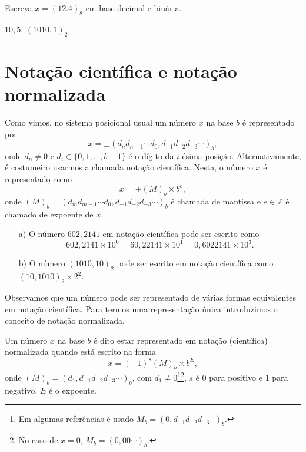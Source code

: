\begin{exer} Escreva $x=(12.4)_8$ em base decimal e binária.
\end{exer}
\begin{resp}
  
    $10,5$; $(1010,1)_2$
  
\end{resp}

\section{Notação científica e notação normalizada}

Como vimos, no sistema posicional usual um número $x$ na base $b$ é representado por
\begin{equation*}
  x = \pm (d_{n}d_{n-1}\cdots d_{0},d_{-1}d_{-2}d_{-3}\cdots)_b,
\end{equation*}
onde $d_{n}\neq 0$ e $d_i\in\{0, 1, \dotsc, b-1\}$ é o dígito da $i$-ésima posição. Alternativamente, é costumeiro usarmos a chamada notação científica. Nesta, o número $x$ é representado como
\begin{equation*}
  x = \pm (M)_b\times b^e,
\end{equation*}
onde $(M)_b = (d_{m}d_{m-1}\cdots d_{0},d_{-1}d_{-2}d_{-3}\cdots)_b$ é chamada de mantissa e $e\in\mathbb{Z}$ é chamado de expoente de $x$.

\begin{ex}
  \begin{itemize}
  \item[a)] O número $602,2141$ em notação científica pode ser escrito como
    \begin{equation*}
      602,2141\times 10^0 = 60,22141\times 10^{1} = 0,6022141\times 10^{3}.
    \end{equation*}
  \item[b)] O número $(1010,10)_2$ pode ser escrito em notação científica como $(10,1010)_2\times 2^2$.
  \end{itemize}
\end{ex}

Observamos que um número pode ser representado de várias formas equivalentes em notação científica. Para termos uma representação única introduzimos o conceito de notação normalizada.

\begin{defn}
  Um número $x$ na base $b$ é dito estar representado em notação (científica) normalizada quando está escrito na forma
  \begin{equation*}
    x=(-1)^{s}(M)_b \times b^{E},
  \end{equation*}
onde $(M)_b = (d_1,d_{-1}d_{-2}d_{-3}\cdots)_b$, com $d_{1}\neq 0$\footnote{Em algumas referências é usado $M_b = (0,d_{-1}d_{-2}d_{-3}\cdot)_b$.}\footnote{No caso de $x=0$, $M_b = (0,00\cdots)_b$.}, $s$ é $0$ para positivo e $1$ para negativo, $E$ é o expoente.
 \end{defn}


